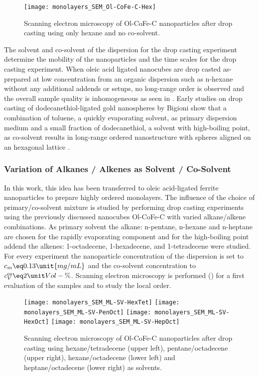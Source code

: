\documentclass[\main/dresen_thesis.tex]{subfiles}
\begin{document}
  \begin{figure}[tb]
    \centering
    \texttt{[image: monolayers\_SEM\_Ol-CoFe-C-Hex]}
    \caption{\label{fig:monolayers:preparation:solventVariation:semNoCoSolvent}Scanning electron microscopy of Ol-CoFe-C nanoparticles after drop casting using only hexane and no co-solvent.}
  \end{figure}
  The solvent and co-solvent of the dispersion for the drop casting experiment determine the mobility of the nanoparticles and the time scales for the drop casting experiment.
  When oleic acid ligated nanocubes are drop casted as-prepared at low concentration from an organic dispersion such as n-hexane without any additional addends or setups, no long-range order is observed and the overall sample quality is inhomogeneous as seen in .
  Early studies on drop casting of dodecanethiol-ligated gold nanospheres by Bigioni \etal show that a combination of toluene, a quickly evaporating solvent, as primary dispersion medium and a small fraction of dodecanethiol, a solvent with high-boiling point, as co-solvent results in long-range ordered nanostructure with spheres aligned on an hexagonal lattice \cite{Bigioni_2006_Kinet}.

  \subsubsection{Variation of Alkanes / Alkenes as Solvent / Co-Solvent}
    In this work, this idea has been transferred to oleic acid-ligated ferrite nanoparticles to prepare highly ordered monolayers.
    The influence of the choice of primary/co-solvent mixture is studied by performing drop casting experiments using the previously discussed nanocubes Ol-CoFe-C with varied alkane/alkene combinations.
    As primary solvent the alkane: n-pentane, n-hexane and n-heptane are chosen for the rapidly evaporating component and for the high-boiling point addend the alkenes: 1-octadecene, 1-hexadecene, and 1-tetradecene were studied.
    For every experiment the nanoparticle concentration of the dispersion is set to $c_m \eq 0.13 \unit{mg/mL}$ and the co-solvent concentration to $c_V^\textsf{co} \eq 2\unit{Vol-\%}$.
    Scanning electron microscopy is performed () for a first evaluation of the samples and to study the local order.

    \begin{figure}[tb]
      \centering
      \texttt{[image: monolayers\_SEM\_ML-SV-HexTet]}
      \texttt{[image: monolayers\_SEM\_ML-SV-PenOct]}
      \texttt{[image: monolayers\_SEM\_ML-SV-HexOct]}
      \texttt{[image: monolayers\_SEM\_ML-SV-HepOct]}
      \caption{\label{fig:monolayers:preparation:solventVariation:sem}Scanning electron microscopy of Ol-CoFe-C nanoparticles after drop casting using hexane/tetradecene (upper left),  pentane/octadecene (upper right), hexane/octadecene (lower left) and heptane/octadecene (lower right) as solvents.}
    \end{figure}
\end{document}

